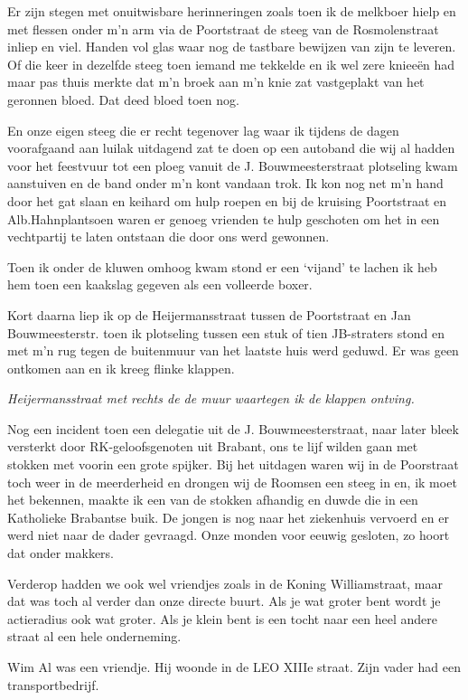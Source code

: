 \documentclass[10pt,twoside,openright]{memoir}
\begin{document}
Er zijn stegen met onuitwisbare herinneringen zoals toen ik de melkboer hielp en met flessen onder m’n arm via de Poortstraat de steeg van de Rosmolenstraat inliep en viel. Handen vol glas waar nog de tastbare bewijzen van zijn te leveren. Of die keer in dezelfde steeg toen iemand me tekkelde en ik wel zere knieeën had maar pas thuis merkte dat m’n broek aan m’n knie zat vastgeplakt van het geronnen bloed. Dat deed bloed toen nog.

En onze eigen steeg die er recht tegenover lag waar ik tijdens de dagen voorafgaand aan luilak uitdagend zat te doen op een autoband die wij al hadden voor het feestvuur tot een ploeg vanuit de J. Bouwmeesterstraat plotseling kwam aanstuiven en de band onder m’n kont vandaan trok. Ik kon nog net m’n hand door het gat slaan en keihard om hulp roepen en bij de kruising Poortstraat en Alb.Hahnplantsoen waren er genoeg vrienden te hulp geschoten om het in een vechtpartij te laten ontstaan die door ons werd gewonnen. 

Toen ik onder de kluwen omhoog kwam stond er een ‘vijand’ te lachen ik heb hem toen een kaakslag gegeven als een volleerde boxer.

Kort daarna liep ik op de Heijermansstraat tussen de Poortstraat en Jan Bouwmeesterstr. toen ik plotseling tussen een stuk of tien JB-straters stond en met m’n rug tegen de buitenmuur van het laatste huis werd geduwd. Er was geen ontkomen aan en ik kreeg flinke klappen. 

\emph{Heijermansstraat met rechts de de muur waartegen ik de klappen ontving.}

Nog een incident toen een delegatie uit de J. Bouwmeesterstraat, naar later bleek versterkt door RK-geloofsgenoten uit Brabant, ons te lijf wilden gaan met stokken met voorin een grote spijker. Bij het uitdagen waren wij in de Poorstraat toch weer in de meerderheid en drongen wij de Roomsen een steeg in en, ik moet het bekennen, maakte ik een van de stokken afhandig en duwde die in een Katholieke Brabantse buik. De jongen is nog naar het ziekenhuis vervoerd en er werd niet naar de dader gevraagd. Onze monden voor eeuwig gesloten, zo hoort dat onder makkers.

Verderop hadden we ook wel vriendjes zoals in de Koning Williamstraat, maar dat was toch al verder dan onze directe buurt. Als je wat groter bent wordt je actieradius ook wat groter. Als je klein bent is een tocht naar een heel andere straat al een hele onderneming.

Wim Al was een vriendje. Hij woonde in de LEO XIIIe straat. Zijn vader had een transportbedrijf. 
\end{document}
